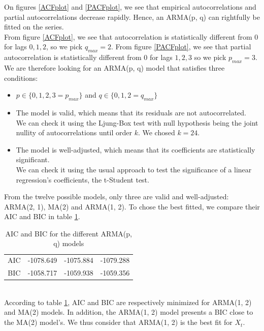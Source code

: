 \documentclass[]{article}
\begin{document}
On figures \ref{ACFplot} and \ref{PACFplot}, we see that empirical autocorrelations and partial autocorrelations decrease rapidly. Hence, an ARMA(p, q) can rightfully be fitted on the series.\\
From figure \ref{ACFplot}, we see that autocorrelation is statistically different from $0$ for lags $0, 1, 2$, so we pick $q_{max}=2$. From figure \ref{PACFplot}, we see that partial autocorrelation is statistically different from $0$ for lags $1, 2, 3$ so we pick $p_{max}=3$.\\

We are therefore looking for an ARMA(p, q) model that satisfies three conditions:
\begin{itemize}
	\item $p\in \{0, 1, 2, 3 =p_{max}\}$ and $q\in \{0, 1, 2=q_{max}\}$
	\item The model is valid, which means that its residuals are not autocorrelated.\\
	We can check it using the Ljung-Box test with null hypothesis being the joint nullity of autocorrelations until order $k$. We chosed $k=24$.
	\item The model is well-adjusted, which means that its coefficients are statistically significant.\\
	We can check it using the usual approach to test the significance of a linear regression's coefficients, the t-Student test.
\end{itemize}
From the twelve possible models, only three are valid and well-adjusted: ARMA(2, 1), MA(2) and ARMA(1, 2). To chose the best fitted, we compare their AIC and BIC in table \ref{AICvsBIC}.
\begin{table}[!h]
	\centering
	\begin{tabular}{|c||c|c|c|}
		\hline
		      & \text{ARMA(2, 1)} & \text{MA(2)} & \text{ARMA(1, 2)}\\
		\hline
		\hline
		AIC & -1078.649 & -1075.884 & -1079.288\\
		\hline
		BIC & -1058.717 & -1059.938 & -1059.356\\
		\hline
	\end{tabular}
	\caption{AIC and BIC for the different ARMA(p, q) models}
	\label{AICvsBIC}
\end{table}\\
According to table \ref{AICvsBIC}, AIC and BIC are respectively minimized for ARMA(1, 2) and MA(2) models. In addition, the ARMA(1, 2) model presents a BIC close to the MA(2) model's. We thus consider that ARMA(1, 2) is the best fit for $X_t$.
\end{document}
